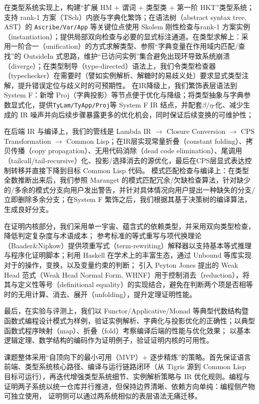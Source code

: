 在类型系统实现上，构建“扩展 HM + 谓词 + 类型类 + 第一阶 HKT”类型系统；支持 rank-1 方案（TSch）内嵌与字典化繁饰；在语法树（abstract syntax tree, AST）的 \texttt{Ascribe/Var/App} 等关键位点使用 Skolem 刚性检查与rank-1 方案实例（instantiation）；提供局部双向检查与必要的显式标注通道。在类型求解上：采用一阶合一（unification）的方式求解类型、参照“字典变量在作用域内匹配/查找”的 OutsideIn 式思路，维护“已访问实例”集合避免出现环导致系统崩溃（diverge）；在类型制导（type-directed）语法上，我们令类型检查器（typechecker）在需要时（譬如实例解析、解糖时的易歧义处）要求显式类型注解，提升错误定位与歧义时的可预期性。
在IR降级上，我们繁饰表层语法到 System F：新增 Proj（字典投影）等节点便于优化与降级；将类型抽象与字典参数显式化，提供\texttt{TyLam/TyApp/Proj}等 System F IR 结点，并配套$\beta/\eta$-化、减少生成的 IR 噪声并向后续步骤暴露更多的优化机会，同时保证后续变换的可维护性；

在后端 IR 与编译上，我们的管线是 Lambda IR $\to$ Closure Conversion $\to$ CPS Transformation $\to$ Common Lisp；在IR层实现常量折叠（constant folding）、拷贝传播（copy propagation）、无用代码消除（dead code elimination）、尾调用（tailcall/tail-recursive）化、投影/选择消去的源优化，最后在CPS层显式表达控制转移并直接下降到目标 Common Lisp 代码。
模式匹配检查与编译上：在类型全数推断出来后，我们参照 Maranget 的模式匹配冗余/欠缺检查算法，针对缺少的/多余的模式分支向用户发出警告，并针对具体情况向用户提出一种缺失的分支/立即删除多余分支；在System F 繁饰之后，我们根据其基于决策树的编译算法，生成良好分支。

在证明内核部分，我们采用单一宇宙、蕴含式的依赖类型\lambdacalc，并采用双向类型检查，降低判定复杂度与术语成本；
参考标准的等式重写与项代换理论（Baader\&Nipkow）提供项重写式（term-rewriting）解释器以支持基本等式推理与程序化证明脚本；利用 Haskell 在学术上的丰富生态，通过 Unbound 等库实现对于\lambdaterm 的操作，变换，以及变量约束的判断；
引入 Peyton Jones 提出的 Weak Head 范式（Weak Head Normal Form, WHNF）用于控制消去（reduction），将其与定义性等号（definitional equality）的实现结合，避免在判断两个项是否相等时的无用计算、消去、展开（unfolding），提升定理证明性能。

最后，在实验与评测上，我们以 Functor/Applicative/Monad 等典型代数结构暨函数式编程设计模式为样例，验证实例解析、字典化与投影优化的正确性；以典型函数式程序映射（map）、折叠（fold）考察编译后端的性能与优化效果；
以基本逻辑定理、数学结构的编码作为证明例子，验证证明内核的可用性。

课题整体采用“自顶向下的最小可用（MVP）+ 逐步精炼”的策略。首先保证语言前端、类型系统核心路径、编译与运行链路闭环（从 Tigris 源到 Common Lisp 目标可运行），再迭代增强类型系统细节、实例解析策略与 IR 优化规则。编程与证明两子系统以统一仓库并行推进，但保持边界清晰、依赖方向单纯：编程侧产物可独立使用，
证明侧可以通过两系统相似的表层语法无痛迁移。

